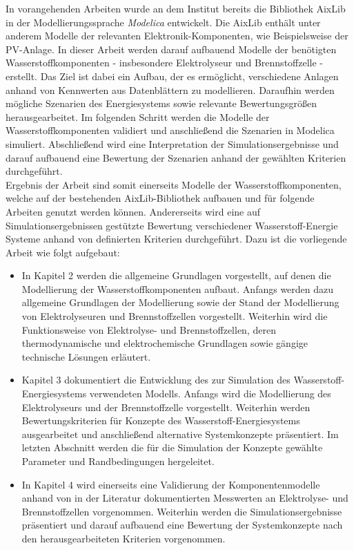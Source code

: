 In vorangehenden Arbeiten wurde an dem Institut bereits die Bibliothek AixLib in der Modellierungssprache \textit{Modelica} entwickelt. Die AixLib enthält unter anderem Modelle der relevanten Elektronik-Komponenten, wie Beispielsweise der PV-Anlage. In dieser Arbeit werden darauf aufbauend Modelle der benötigten Wasserstoffkomponenten - insbesondere Elektrolyseur und Brennstoffzelle - erstellt. Das Ziel ist dabei ein Aufbau, der es ermöglicht, verschiedene Anlagen anhand von Kennwerten aus Datenblättern zu modellieren. Daraufhin werden mögliche Szenarien des Energiesystems sowie relevante Bewertungsgrößen herausgearbeitet. Im folgenden Schritt werden die Modelle der Wasserstoffkomponenten validiert und anschließend die Szenarien in Modelica simuliert. Abschließend wird eine Interpretation der Simulationsergebnisse und darauf aufbauend eine Bewertung der Szenarien anhand der gewählten Kriterien durchgeführt.\\

Ergebnis der Arbeit sind somit einerseits Modelle der Wasserstoffkomponenten, welche auf der bestehenden AixLib-Bibliothek aufbauen und für folgende Arbeiten genutzt werden können. Andererseits wird eine auf Simulationsergebnissen gestützte Bewertung verschiedener Wasserstoff-Energie Systeme anhand von definierten Kriterien durchgeführt. Dazu ist die vorliegende Arbeit wie folgt aufgebaut:

\begin{itemize}
\item In Kapitel 2 werden die allgemeine Grundlagen vorgestellt, auf denen die Modellierung der Wasserstoffkomponenten aufbaut. Anfangs werden dazu allgemeine Grundlagen der Modellierung sowie der Stand der Modellierung von Elektrolyseuren und Brennstoffzellen vorgestellt. Weiterhin wird die Funktionsweise von Elektrolyse- und Brennstoffzellen, deren thermodynamische und elektrochemische Grundlagen sowie gängige technische Lösungen erläutert.
\item Kapitel 3 dokumentiert die Entwicklung des zur Simulation des Wasserstoff-Energiesystems verwendeten Modells. Anfangs wird die Modellierung des Elektrolyseurs und der Brennstoffzelle vorgestellt. Weiterhin werden Bewertungskriterien für Konzepte des Wasserstoff-Energiesystems ausgearbeitet und anschließend alternative Systemkonzepte präsentiert. Im letzten Abschnitt werden die für die Simulation der Konzepte gewählte Parameter und Randbedingungen hergeleitet.
\item In Kapitel 4 wird einerseits eine Validierung der Komponentenmodelle anhand von in der Literatur dokumentierten Messwerten an Elektrolyse- und Brennstoffzellen vorgenommen. Weiterhin werden die Simulationsergebnisse präsentiert und darauf aufbauend eine Bewertung der Systemkonzepte nach den herausgearbeiteten Kriterien vorgenommen.
\end{itemize}
